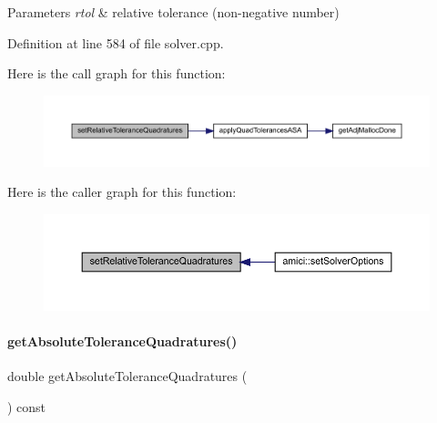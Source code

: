 \begin{DoxyParams}{Parameters}
{\em rtol} & relative tolerance (non-\/negative number) \\
\hline
\end{DoxyParams}


Definition at line 584 of file solver.\+cpp.

Here is the call graph for this function\+:
\nopagebreak
\begin{figure}[H]
\begin{center}
\leavevmode
\includegraphics[width=350pt]{classamici_1_1_solver_a086428d30274f2b7e6f94e8e7593dd8b_cgraph}
\end{center}
\end{figure}
Here is the caller graph for this function\+:
\nopagebreak
\begin{figure}[H]
\begin{center}
\leavevmode
\includegraphics[width=350pt]{classamici_1_1_solver_a086428d30274f2b7e6f94e8e7593dd8b_icgraph}
\end{center}
\end{figure}
\mbox{\label{classamici_1_1_solver_a1f50a4e21784c2757530068483c405cb}} 
\paragraph{\texorpdfstring{get\+Absolute\+Tolerance\+Quadratures()}{getAbsoluteToleranceQuadratures()}}
{\footnotesize\ttfamily double get\+Absolute\+Tolerance\+Quadratures (\begin{DoxyParamCaption}{ }\end{DoxyParamCaption}) const}

